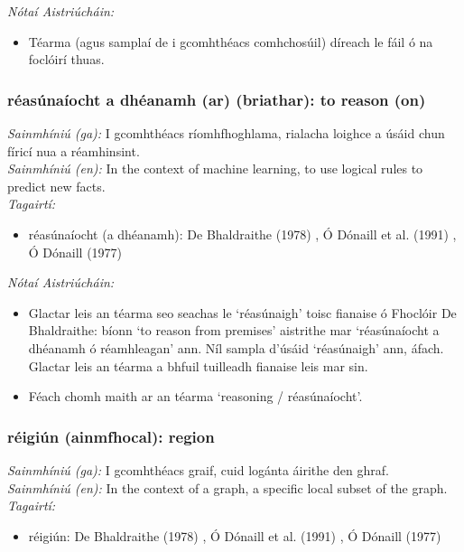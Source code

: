  \noindent \textit{Nótaí Aistriúcháin:}
\begin{itemize}
	\item Téarma (agus samplaí de i gcomhthéacs comhchosúil) díreach le fáil ó na foclóirí thuas.
\end{itemize}


\subsubsection*{réasúnaíocht a dhéanamh (ar) (briathar): to reason (on)}
 \noindent \textit{Sainmhíniú (ga):} I gcomhthéacs ríomhfhoghlama, rialacha loighce a úsáid chun fíricí nua a réamhinsint.
\\
 \noindent \textit{Sainmhíniú (en):} In the context of machine learning, to use logical rules to predict new facts.
\\
 \noindent \textit{Tagairtí:}
\begin{itemize}
	\item réasúnaíocht (a dhéanamh): De Bhaldraithe (1978) \cite{de-bhaldraithe}, Ó Dónaill et al. (1991) \cite{focloir-beag}, Ó Dónaill (1977) \cite{odonaill}
\end{itemize}

 \noindent \textit{Nótaí Aistriúcháin:}
\begin{itemize}
	\item Glactar leis an téarma seo seachas le `réasúnaigh' toisc fianaise ó Fhoclóir De Bhaldraithe: bíonn `to reason from premises' aistrithe mar `réasúnaíocht a dhéanamh ó réamhleagan' ann. Níl sampla d'úsáid `réasúnaigh' ann, áfach. Glactar leis an téarma a bhfuil tuilleadh fianaise leis mar sin.
	\item Féach chomh maith ar an téarma `reasoning / réasúnaíocht'.
\end{itemize}


\subsubsection*{réigiún (ainmfhocal): region}
 \noindent \textit{Sainmhíniú (ga):} I gcomhthéacs graif, cuid logánta áirithe den ghraf.
\\
 \noindent \textit{Sainmhíniú (en):} In the context of a graph, a specific local subset of the graph.
\\
 \noindent \textit{Tagairtí:}
\begin{itemize}
	\item réigiún: De Bhaldraithe (1978) \cite{de-bhaldraithe}, Ó Dónaill et al. (1991) \cite{focloir-beag}, Ó Dónaill (1977) \cite{odonaill}
\end{itemize}

